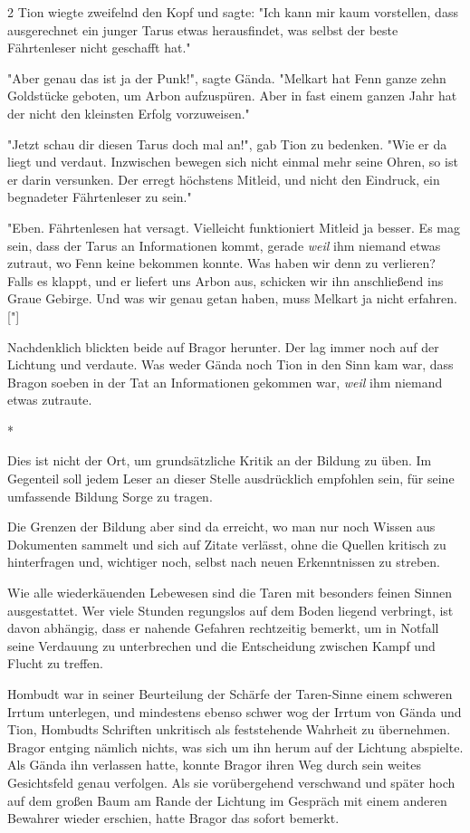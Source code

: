 \documentclass[10pt, a4paper, oneside]{book}
\begin{document}
\begin{multicols}{2}
Tion wiegte zweifelnd den Kopf und sagte: "Ich kann mir kaum vorstellen, dass ausgerechnet ein junger Tarus etwas herausfindet, was selbst der beste Fährtenleser nicht geschafft hat." 

"Aber genau das ist ja der Punk!", sagte Gända. "Melkart hat Fenn ganze zehn Goldstücke geboten, um Arbon aufzuspüren. Aber in fast einem ganzen Jahr hat der nicht den kleinsten Erfolg vorzuweisen." 

"Jetzt schau dir diesen Tarus doch mal an!", gab Tion zu bedenken. "Wie er da liegt und verdaut. Inzwischen bewegen sich nicht einmal mehr seine Ohren, so ist er darin versunken. Der erregt höchstens Mitleid, und nicht den Eindruck, ein begnadeter Fährtenleser zu sein." 

"Eben. Fährtenlesen hat versagt. Vielleicht funktioniert Mitleid ja besser. Es mag sein, dass der Tarus an Informationen kommt, gerade \textit{weil} ihm niemand etwas zutraut, wo Fenn keine bekommen konnte. Was haben wir denn zu verlieren? Falls es klappt, und er liefert uns Arbon aus, schicken wir ihn anschließend ins Graue Gebirge. Und was wir genau getan haben, muss Melkart ja nicht erfahren.["] 

Nachdenklich blickten beide auf Bragor herunter. Der lag immer noch auf der Lichtung und verdaute. Was weder Gända noch Tion in den Sinn kam war, dass Bragon soeben in der Tat an Informationen gekommen war, \textit{weil} ihm niemand etwas zutraute. 

\begin{center}
    *
\end{center}

Dies ist nicht der Ort, um grundsätzliche Kritik an der Bildung zu üben. Im Gegenteil soll jedem Leser an dieser Stelle ausdrücklich empfohlen sein, für seine umfassende Bildung Sorge zu tragen. 

Die Grenzen der Bildung aber sind da erreicht, wo man nur noch Wissen aus Dokumenten sammelt und sich auf Zitate verlässt, ohne die Quellen kritisch zu hinterfragen und, wichtiger noch, selbst nach neuen Erkenntnissen zu streben. 

Wie alle wiederkäuenden Lebewesen sind die Taren mit besonders feinen Sinnen ausgestattet. Wer viele Stunden regungslos auf dem Boden liegend verbringt, ist davon abhängig, dass er nahende Gefahren rechtzeitig bemerkt, um in Notfall seine Verdauung zu unterbrechen und die Entscheidung zwischen Kampf und Flucht zu treffen. 

Hombudt war in seiner Beurteilung der Schärfe der Taren-Sinne einem schweren Irrtum unterlegen, und mindestens ebenso schwer wog der Irrtum von Gända und Tion, Hombudts Schriften unkritisch als feststehende Wahrheit zu übernehmen. Bragor entging nämlich nichts, was sich um ihn herum auf der Lichtung abspielte. Als Gända ihn verlassen hatte, konnte Bragor ihren Weg durch sein weites Gesichtsfeld genau verfolgen. Als sie vorübergehend verschwand und später hoch auf dem großen Baum am Rande der Lichtung im Gespräch mit einem anderen Bewahrer wieder erschien, hatte Bragor das sofort bemerkt. 


\end{multicols}
\end{document}
